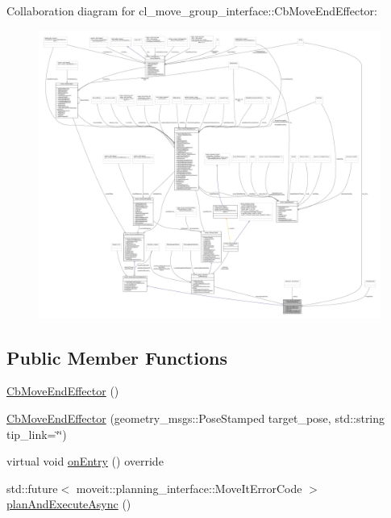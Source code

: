 Collaboration diagram for cl\+\_\+move\+\_\+group\+\_\+interface\+:\+:Cb\+Move\+End\+Effector\+:
\nopagebreak
\begin{figure}[H]
\begin{center}
\leavevmode
\includegraphics[width=350pt]{classcl__move__group__interface_1_1CbMoveEndEffector__coll__graph}
\end{center}
\end{figure}
\subsection*{Public Member Functions}
\begin{DoxyCompactItemize}
\item 
\hyperlink{classcl__move__group__interface_1_1CbMoveEndEffector_a5bcaaff082b7d8039a4f491b2797776e}{Cb\+Move\+End\+Effector} ()
\item 
\hyperlink{classcl__move__group__interface_1_1CbMoveEndEffector_a237d308fbeabd9c4bac82cf31b8fad33}{Cb\+Move\+End\+Effector} (geometry\+\_\+msgs\+::\+Pose\+Stamped target\+\_\+pose, std\+::string tip\+\_\+link=\char`\"{}\char`\"{})
\item 
virtual void \hyperlink{classcl__move__group__interface_1_1CbMoveEndEffector_a7e7c22ac6c5725bc95e9852c3f6d939d}{on\+Entry} () override
\item 
std\+::future$<$ moveit\+::planning\+\_\+interface\+::\+Move\+It\+Error\+Code $>$ \hyperlink{classcl__move__group__interface_1_1CbMoveEndEffector_a3bfcff44a66cef88fe687b979de9604d}{plan\+And\+Execute\+Async} ()
\end{DoxyCompactItemize}
